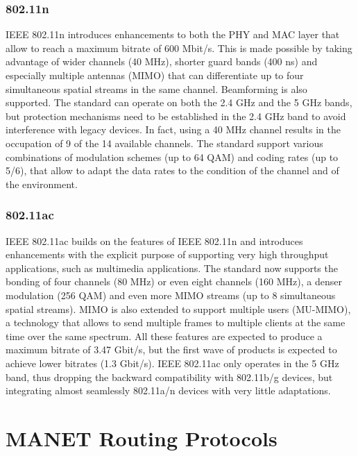 \subsubsection{802.11n}

IEEE 802.11n introduces enhancements to both the PHY and MAC layer that allow to reach a maximum bitrate of 600 Mbit/s. This is made possible by taking advantage of wider channels (40 MHz), shorter guard bands (400 ns) and especially multiple antennas (MIMO) that can differentiate up to four simultaneous spatial streams in the same channel. Beamforming is also supported. The standard can operate on both the 2.4 GHz and the 5 GHz bands, but protection mechanisms need to be established in the 2.4 GHz band to avoid interference with legacy devices. In fact, using a 40 MHz channel results in the occupation of 9 of the 14 available channels. The standard support various combinations of modulation schemes (up to 64 QAM) and coding rates (up to 5/6), that allow to adapt the data rates to the condition of the channel and of the environment.

\subsubsection{802.11ac}

IEEE 802.11ac builds on the features of IEEE 802.11n and introduces enhancements with the explicit purpose of supporting very high throughput applications, such as multimedia applications. The standard now supports the bonding of four channels (80 MHz) or even eight channels (160 MHz), a denser modulation (256 QAM) and even more MIMO streams (up to 8 simultaneous spatial streams). MIMO is also extended to support multiple users (MU-MIMO), a technology that allows to send multiple frames to multiple clients at the same time over the same spectrum. All these features are expected to produce a maximum bitrate of 3.47 Gbit/s, but the first wave of products is expected to achieve lower bitrates (1.3 Gbit/s). IEEE 802.11ac only operates in the 5 GHz band, thus dropping the backward compatibility with 802.11b/g devices, but integrating almost seamlessly 802.11a/n devices with very little adaptations.

\section{MANET Routing Protocols}

